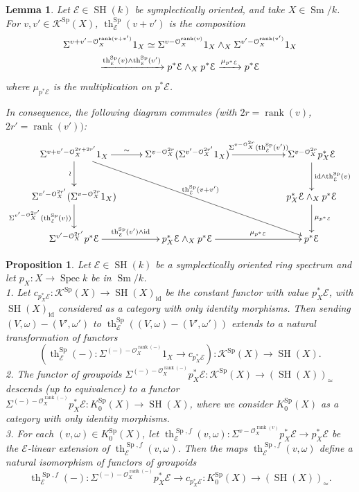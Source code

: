 \documentclass[10pt]{amsart}
\theoremstyle{definition}
\theoremstyle{plain}
\newtheorem{prop}[defn]{Proposition}
\newtheorem{lemma}[defn]{Lemma}
\numberwithin{equation}{section}
\newcommand{\0}{\emptyset}
\newcommand{\sE}{{\mathcal E}}
\newcommand{\sK}{{\mathcal K}}
\newcommand{\sO}{{\mathcal O}}
\newcommand{\Sp}{{\operatorname{Sp}}}
\newcommand{\Spec}{{\operatorname{Spec}}}
\newcommand{\SH}{{\operatorname{SH}}}
\newcommand{\Sm}{{\operatorname{Sm}}}
\renewcommand{\th}{{\operatorname{th}}}
\newcommand{\rnk}{{\operatorname{rank}}}
\newcommand{\id}{{\operatorname{id}}}
\begin{document}
\begin{lemma}\label{lem:SympThomMult} Let $\sE\in \SH(k)$ be symplectically oriented, and take $X\in \Sm/k$. 
For $v,v'\in \sK^\Sp(X)$, $\th_\sE^\Sp(v+v')$ is the composition
\begin{multline}\label{multline:SympThomMult}
\Sigma^{v+v'-\sO_X^{\rnk(v+v')}}1_X\simeq \Sigma^{v-\sO_X^{\rnk(v)}}1_X\wedge_X\Sigma^{v'-\sO_X^{\rnk(v')}}
1_X\\\xrightarrow{\th_\sE^\Sp(v)\wedge\th^\Sp_\sE(v')}p^*\sE\wedge_Xp^*\sE\xrightarrow{\mu_{p^*\sE}} p^*\sE\notag
\end{multline}
where $\mu_{p^*\sE}$ is the multiplication on $p^*\sE$. 

In consequence, the following diagram commutes (with $2r=\rnk(v)$, $2r'=\rnk(v'))$:
\[
\xymatrix{
\Sigma^{v+v'-\sO_X^{2r+2r'}}1_X\ar[ddrrr]^{\th^\Sp_\sE(v+v')}\ar[d]_-\wr\ar[r]^-\sim&\Sigma^{v-\sO_X^{2r}}(\Sigma^{v'-\sO_X^{2r'}}1_X)\ar[rr]^-{\Sigma^{v-\sO_X^{2r}}(\th^\Sp_\sE(v'))}&&\Sigma^{v-\sO_X^{2r}}p_X^*\sE\ar[d]^-{\id\wedge\th^\Sp_\sE(v)}\\
\Sigma^{v'-\sO_X^{2r'}}(\Sigma^{v-\sO_X^{2r}}1_X)
\ar[d]_-{\Sigma^{v'-\sO_X^{2r'}}(\th^\Sp_\sE(v))}&&&p_X^*\sE\wedge_Xp^*\sE\ar[d]^-{\mu_{p^*\sE}}\\
\Sigma^{v'-\sO_X^{2r'}}p^*\sE\ar[r]^-{\th^\Sp_\sE(v')\wedge\id}&p_X^*\sE\wedge_Xp^*\sE\ar[rr]^-{\mu_{p^*\sE}}&&p^*\sE
}
\]
\end{lemma}

\begin{prop}\label{prop:K_0SpExtensionTh(-)} Let $\sE\in\SH(k)$ be a symplectically oriented ring spectrum and let $p_X:X\to \Spec k$ be in $\Sm/k$.\\[5pt]
1. Let $c_{p_X^*\sE}:\sK^\Sp(X)\to \SH(X)_{\id}$ be the constant functor with value $ p_X^*\sE$, with $\SH(X)_{\id}$ considered as a category with only identity morphisms. Then sending $(V,\omega)-(V',\omega')$ to $\th^{\Sp}_{\sE}((V,\omega)-(V',\omega'))$ extends to a natural transformation of functors
\[
(\th^{\Sp}_{\sE}(-):\Sigma^{(-)-\sO_X^{\rnk(-)}}1_X\to c_{p_X^*\sE}):\sK^\Sp(X)\to \SH(X). 
\]
2. The functor of groupoids $\Sigma^{(-)-\sO_X^{\rnk(-)}}p^*_X\sE:\sK^\Sp(X)\to (\SH(X))_\simeq$ descends (up to equivalence) to a functor $\Sigma^{(-)-\sO_X^{\rnk(-)}}p^*_X\sE:K_0^\Sp(X)\to \SH(X)$, where we consider 
$K_0^\Sp(X)$ as a category with only identity morphisms.\\[2pt]
3. For each $(v,\omega)\in K^\Sp_0(X)$, let $\th^{\Sp,f}_{\sE}(v, \omega):
\Sigma^{v-\sO_X^{\rnk(v)}}p^*_X\sE\to p_X^*\sE$ be the $\sE$-linear extension of  
$\th^{\Sp,f}_{\sE}(v, \omega)$. Then the maps $\th^{\Sp,f}_{\sE}(v, \omega)$ define a natural isomorphism of functors of groupoids
\[
\th^{\Sp,f}_{\sE}(-):\Sigma^{(-)-\sO_X^{\rnk(-)}}p^*_X\sE\to c_{p_X^*\sE}:K_0^\Sp(X)\to (\SH(X))_\simeq. 
\]
\end{prop}
\end{document}
